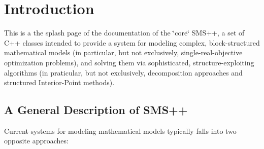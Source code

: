  \section*{Introduction }

This is a the splash page of the documentation of the \char`\"{}core\char`\"{} S\+M\+S++, a set of C++ classes intended to provide a system for modeling complex, block-\/structured mathematical models (in particular, but not exclusively, single-\/real-\/objective optimization problems), and solving them via sophisticated, structure-\/exploiting algorithms (in praticular, but not exclusively, decomposition approaches and structured Interior-\/\+Point methods).

\subsection*{A General Description of S\+M\+S++ }

Current systems for modeling mathematical models typically falls into two opposite approaches\+:


